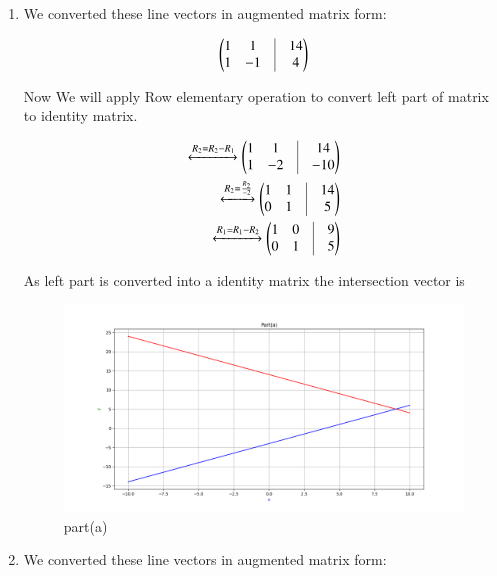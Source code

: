 
\begin{enumerate}
    \item We converted these line vectors in augmented matrix form:

\begin{align}
    \myvec{1 & 1 & \vrule & 14\\1 & -1 & \vrule & 4}\\
\end{align} 

Now We will apply Row elementary operation to convert left part of matrix to identity matrix.

\begin{align}
    \xleftrightarrow[]{R_{2}=R_{2}-R_{1}} \myvec{1 & 1 & \vrule & 14\\1 & -2 & \vrule & -10}
\\
    \xleftrightarrow[]{R_{2}=\frac{R_{2}}{-2}} \myvec{1 & 1 & \vrule & 14\\0 & 1 & \vrule & 5}
\\
    \xleftrightarrow[]{R_{1}=R_{1}-R_{2}} \myvec{1 & 0 & \vrule & 9\\0 & 1 & \vrule & 5}
\end{align}

As left part is converted into a identity matrix the intersection vector is 
    

\begin{figure}[!ht]
    \centering
    \includegraphics[width=\columnwidth]{./solutions/line_plane/18/figures//A1_parta}
\caption{part(a)}
\label{fig:solutions/line_plane/18/ part(a)}
\end{figure}

\item We converted these line vectors in augmented matrix form: 


\end{enumerate}
